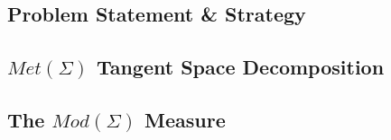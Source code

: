 \subsection{Problem Statement \& Strategy}
    

\subsection{$Met(\Sigma)$ Tangent Space Decomposition}
    

\subsection{The $Mod(\Sigma)$ Measure}
    
